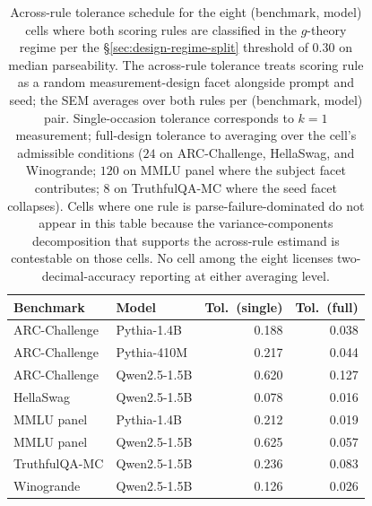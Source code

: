 \documentclass[11pt]{article}
\begin{document}
\begin{table}[h]
\centering
\small
\caption{Across-rule tolerance schedule for the eight (benchmark, model) cells where both scoring rules are classified in the $g$-theory regime per the §\ref{sec:design-regime-split} threshold of $0.30$ on median parseability. The across-rule tolerance treats scoring rule as a random measurement-design facet alongside prompt and seed; the SEM averages over both rules per (benchmark, model) pair. Single-occasion tolerance corresponds to $k = 1$ measurement; full-design tolerance to averaging over the cell's admissible conditions ($24$ on ARC-Challenge, HellaSwag, and Winogrande; $120$ on MMLU panel where the subject facet contributes; $8$ on TruthfulQA-MC where the seed facet collapses). Cells where one rule is parse-failure-dominated do not appear in this table because the variance-components decomposition that supports the across-rule estimand is contestable on those cells. No cell among the eight licenses two-decimal-accuracy reporting at either averaging level.}
\label{tab:tolerance-across-rule}
\begin{tabular}{llrr}
\toprule
Benchmark & Model & Tol.\ (single) & Tol.\ (full) \\
\midrule
ARC-Challenge & Pythia-1.4B  & 0.188 & 0.038 \\
ARC-Challenge & Pythia-410M  & 0.217 & 0.044 \\
ARC-Challenge & Qwen2.5-1.5B & 0.620 & 0.127 \\
HellaSwag     & Qwen2.5-1.5B & 0.078 & 0.016 \\
MMLU panel    & Pythia-1.4B  & 0.212 & 0.019 \\
MMLU panel    & Qwen2.5-1.5B & 0.625 & 0.057 \\
TruthfulQA-MC & Qwen2.5-1.5B & 0.236 & 0.083 \\
Winogrande    & Qwen2.5-1.5B & 0.126 & 0.026 \\
\bottomrule
\end{tabular}
\end{table}
\end{document}
